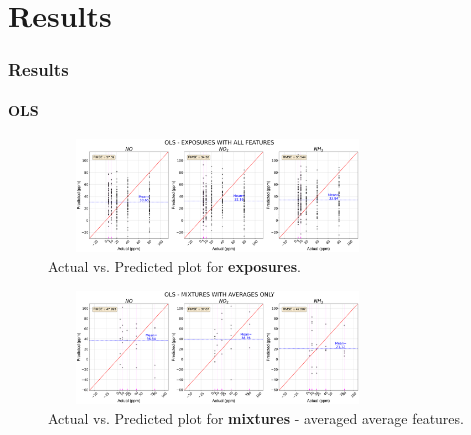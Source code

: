 \documentclass{beamer}
\begin{document}
\section{Results}
\begin{frame}
	\frametitle{Results}
	\framesubtitle{OLS}
		
		\begin{figure}[b]
			\includegraphics[width=0.8\textwidth, height = 3cm, keepaspectratio]{../../figures/ols-act-vs-pred.png}
			\caption{Actual vs. Predicted plot for \textbf{exposures}.}
			\label{fig:ols-exposures} 
		\end{figure}
		
		\begin{figure}[b]
			\includegraphics[width=0.8\textwidth, height = 3cm, keepaspectratio]{../../figures/ols-avg-act-vs-pred.png}
			\caption{Actual vs. Predicted plot for \textbf{mixtures} - averaged average features.}
			\label{fig:ols-averaged}
		\end{figure}
\end{frame}
\end{document}
